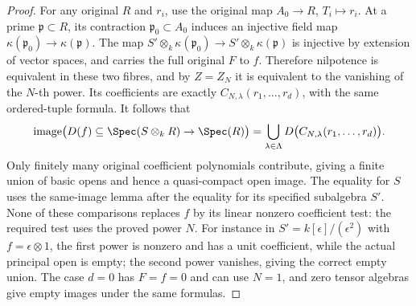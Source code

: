 \begin{proof}
For any original $R$ and $r_i$, use the original
map $A_0\to R$, $T_i\mapsto r_i$.
At a prime $\mathfrak p\subset R$, its contraction
$\mathfrak p_0\subset A_0$ induces an injective
field map $\kappa(\mathfrak p_0)\to\kappa(\mathfrak p)$.
The map
$S'\otimes_k\kappa(\mathfrak p_0)\to
S'\otimes_k\kappa(\mathfrak p)$ is injective by
extension of vector spaces, and carries the full
original $F$ to $f$. Therefore nilpotence is
equivalent in these two fibres, and by $Z=Z_N$
it is equivalent to the vanishing of the $N$-th
power. Its coefficients are exactly
$C_{N,\lambda}(r_1,\ldots,r_d)$, with the same
ordered-tuple formula. It follows that
$$
\operatorname{image}\bigl(D(f)\subseteq
\Spec(S\otimes_kR)\to\Spec(R)\bigr)
=\bigcup_{\lambda\in\Lambda}
D\bigl(C_{N,\lambda}(r_1,\ldots,r_d)\bigr).
$$
Only finitely many original coefficient polynomials
contribute, giving a finite union of basic opens
and hence a quasi-compact open image. The equality
for $S$ uses the same-image lemma after the equality
for its specified subalgebra $S'$. None of these
comparisons replaces $f$ by its linear nonzero
coefficient test: the required test uses the
proved power $N$. For instance in
$S'=k[\epsilon]/(\epsilon^2)$ with $f=\epsilon\otimes1$,
the first power is nonzero and has a unit coefficient,
while the actual principal open is empty; the
second power vanishes, giving the correct empty
union. The case $d=0$ has $F=f=0$ and can use
$N=1$, and zero tensor algebras give empty images
under the same formulas.
\end{proof}